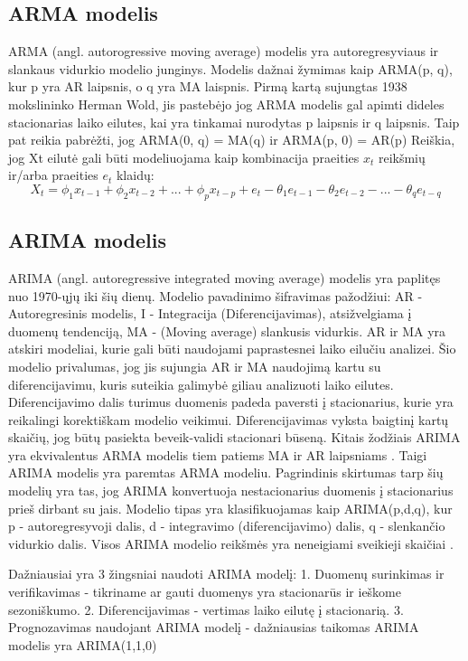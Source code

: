 \documentclass{VUMIFInfKursinis}
\begin{document}
\subsection {ARMA modelis}
ARMA (angl. autorogressive moving average) modelis yra autoregresyviaus ir slankaus vidurkio modelio junginys. Modelis dažnai žymimas
kaip ARMA(p, q), kur p yra AR laipsnis, o q yra MA laispnis. Pirmą kartą sujungtas 1938 mokslininko Herman Wold, jis pastebėjo jog ARMA modelis gal apimti 
dideles stacionarias laiko eilutes, kai yra tinkamai nurodytas p laipsnis ir q laipsnis. Taip pat reikia pabrėžti, jog ARMA(0, q) = MA(q) ir ARMA(p, 0) = AR(p)
Reiškia, jog Xt eilutė gali būti modeliuojama kaip kombinacija praeities $x_{t}$ reikšmių ir/arba praeities $e_{t}$ klaidų:
\[X_{t} = \phi_{1}x_{t-1} + \phi_{2}x_{t-2} + ... + \phi_{p}x_{t-p} + e_{t} - \theta_{1}e_{t-1} - \theta_{2}e_{t-2} - ... - \theta_{q}e_{t-q}\]


\subsection {ARIMA modelis}
ARIMA (angl. autoregressive integrated moving average) modelis yra paplitęs nuo 1970-ųjų iki šių dienų. Modelio pavadinimo šifravimas
pažodžiui: AR - Autoregresinis modelis, I - Integracija (Diferencijavimas), atsižvelgiama į duomenų tendenciją, MA - (Moving average) slankusis vidurkis.
AR ir MA yra atskiri modeliai, kurie gali būti naudojami paprastesnei laiko eilučiu analizei. Šio modelio privalumas, jog jis sujungia AR ir MA naudojimą kartu su
diferencijavimu, kuris suteikia galimybė giliau analizuoti laiko eilutes. Diferencijavimo dalis turimus duomenis padeda paversti į stacionarius, 
kurie yra reikalingi korektiškam modelio veikimui. Diferencijavimas vyksta baigtinį kartų skaičių, jog būtų pasiekta beveik-validi stacionari būseną. 
Kitais žodžiais ARIMA yra ekvivalentus ARMA modelis tiem patiems MA ir AR laipsniams \cite{hua2020bitcoin}. Taigi ARIMA modelis yra paremtas ARMA modeliu. 
Pagrindinis skirtumas tarp šių modelių yra tas, jog ARIMA konvertuoja nestacionarius duomenis į stacionarius prieš dirbant su jais. Modelio tipas yra 
klasifikuojamas kaip ARIMA(p,d,q), kur p - autoregresyvoji dalis, d - integravimo (diferencijavimo) dalis, q - slenkančio vidurkio dalis. Visos ARIMA modelio
reikšmės yra neneigiami sveikieji skaičiai \cite{mondal2014study}.

Dažniausiai yra 3 žingsniai naudoti ARIMA modelį:
1. Duomenų surinkimas ir verifikavimas - tikriname ar gauti duomenys yra stacionarūs ir ieškome sezoniškumo.
2. Diferencijavimas - vertimas laiko eilutę į stacionarią.
3. Prognozavimas naudojant ARIMA modelį - dažniausias taikomas ARIMA modelis yra ARIMA(1,1,0)
\end{document}
